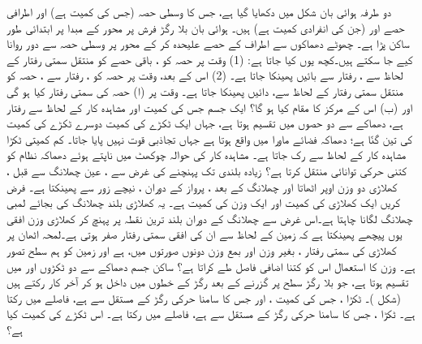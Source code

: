 دو طرفہ ہوائی بان شکل  میں دکھایا گیا ہے، جس کا وسطی حصہ  (جس کی کمیت    ہے)   اور اطرافی حصے  اور   (جن کی   انفرادی  کمیت  ہے) ہیں۔ ہوائی بان بلا رگڑ فرش پر  محور کے مبدا پر ابتدائی طور ساکن پڑا ہے۔ چھوٹے دھماکوں  سے اطراف کے حصے علیحدہ کر کے  محور پر وسطی حصہ سے دور روانا کیے جا سکتے ہیں۔کچھ یوں کیا جاتا ہے: (1)  وقت  پر  حصہ  کو   ،   باقی حصے کو منتقل سمتی  رفتار کے لحاظ سے ،  رفتار سے بائیں پھینکا جاتا ہے۔ (2) اس کے بعد، وقت  پر   حصہ  کو ،  رفتار سے ،  حصہ   کو منتقل  سمتی رفتار کے لحاظ سے، دائیں پھینکا جاتا ہے۔ وقت  پر (ا)  حصہ  کی سمتی رفتار کیا ہو گی  اور (ب)  اس کے مرکز کا مقام کیا ہو گا؟
  ایک جسم جس کی کمیت   اور مشاہدہ کار کے لحاظ سے رفتار  ہے، دھماکے سے دو حصوں میں تقسیم ہوتا ہے، جہاں ایک ٹکڑے کی کمیت دوسرے ٹکڑے کی کمیت کی تین گنّا ہے؛ دھماکہ  فضائے ماورا  میں واقع ہوتا ہے جہاں تجاذبی قوت نہیں پایا جاتا۔ کم کمیتی ٹکڑا مشاہدہ کار کے لحاظ سے رک جاتا ہے۔ مشاہدہ کار کی حوالہ چوکھٹ  میں ناپتے ہوئے دھماکہ نظام کو کتنی حرکی توانائی منتقل کرتا ہے؟
زیادہ بلندی تک پہنچنے   کی غرض سے   ، عین  چھلانگ     سے قبل ، کھلاڑی دو    وزن  اوپر اٹھاتا اور چھلانگ کے بعد  ، پرواز کے دوران ، نیچے  زور سے  پھینکتا ہے۔  فرض کریں  ایک  کھلاڑی کی کمیت  اور   ایک وزن کی کمیت  ہے۔ یہ کھلاڑی بلند چھلانگ کی بجائے لمبی چھلانگ لگانا چاہتا ہے۔اس غرض سے چھلانگ کے دوران بلند ترین نقطہ پر پہنچ کر کھلاڑی وزن افقی یوں  پیچھے  پھینکتا ہے کہ زمین کے لحاظ سے ان کی افقی سمتی  رفتار صفر ہوتی ہے۔لمحہ  اٹھان پر کھلاڑی کی سمتی رفتار ، بغیر وزن اور بمع وزن دونوں صورتوں میں،  ہے اور زمین  کو ہم سطح  تصور ہے۔ وزن کا استعمال اس کو کتنا  اضافی فاصل طے کراتا ہے؟
ساکن جسم دھماکے سے دو ٹکڑوں  اور  میں تقسیم ہوتا ہے، جو بلا رگڑ سطح  پر  گزرنے کے بعد  رگڑ کے خطوں میں داخل ہو کر آخر کار رکتے ہیں (شکل )۔ ٹکڑا ، جس کی کمیت  ، اور جس   کا  سامنا  حرکی رگڑ کے مستقل سے  ہے،  فاصلے میں رکتا ہے۔  ٹکڑا ، جس   کا  سامنا  حرکی رگڑ کے مستقل سے  ہے،  فاصلے میں رکتا ہے۔ اس ٹکڑے کی کمیت کیا ہے؟
